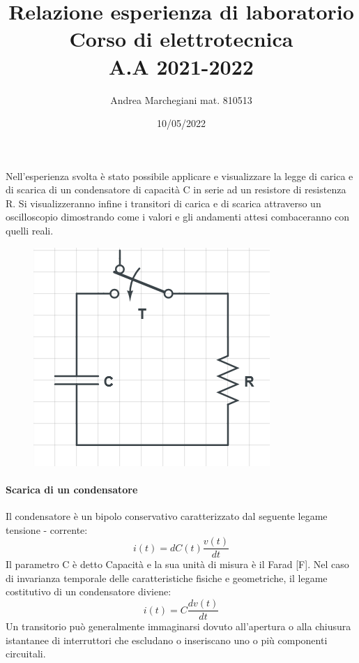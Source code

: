 \documentclass[a4paper, 12pt, twoside]{report}
\begin{document}
	\title{Relazione esperienza di laboratorio \\ Corso di elettrotecnica \\ A.A 2021-2022}
	\author{Andrea Marchegiani mat. 810513}
	\date{10/05/2022}
	\maketitle
		
	Nell'esperienza svolta è stato possibile applicare e visualizzare la legge di carica e di scarica di un condensatore di capacità C in serie ad un resistore di resistenza R. {}
	Si visualizzeranno infine i transitori di carica e di scarica attraverso un oscilloscopio dimostrando come i valori e gli andamenti attesi combaceranno con quelli reali. {} 	
	
	
\begin{figure}
		\includegraphics[width=1\linewidth]{"Carica&Scarica/Scarica RC"}
		\label{fig:RC}		
\end{figure}

\paragraph {Scarica di un condensatore} \mbox{} \newline
Il condensatore è un bipolo conservativo caratterizzato dal seguente legame tensione - corrente:
\begin{equation}
	\label{1:1}
 i\left(t\right) = dC\left(t\right) {\frac{v\left(t\right)}{dt}}
\end{equation}
Il parametro C è detto Capacità e la sua unità di misura è il Farad [F].
Nel caso di invarianza temporale delle caratteristiche fisiche e geometriche, il legame costitutivo di un condensatore diviene: 
\begin{equation}
	\label{1:2}
i\left(t\right)=C\frac{dv\left(t\right)}{dt}
\end{equation}
 Un transitorio può generalmente immaginarsi dovuto all’apertura o alla chiusura istantanee di interruttori che escludano o inseriscano uno o più componenti circuitali.{}
 
\end{document}
